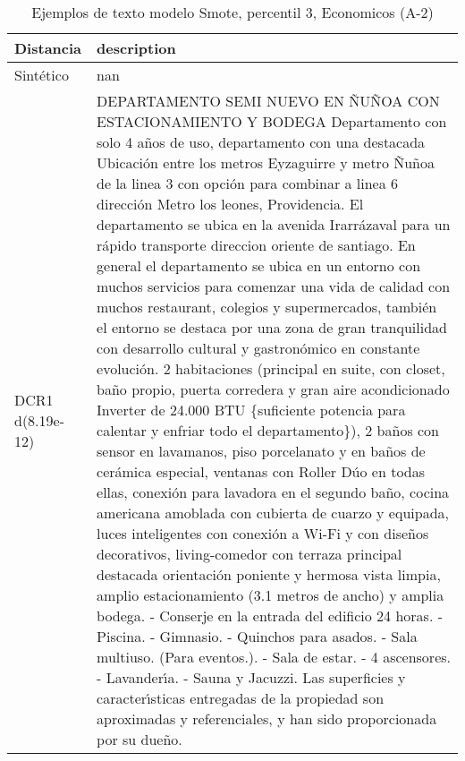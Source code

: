 \begin{table}[H]
\centering
\fontsize{10}{14}\selectfont
\caption{Ejemplos de texto modelo Smote, percentil 3, Economicos (A-2)}
\label{table-example-economicos-a-2-smote-enc-3p-text}
\begin{tabular}{|l|m{35em}|}
\hline
\rowcolor[gray]{0.8}
Distancia & description \\
\hline Sintético & nan \\
\hline DCR1 d(8.19e-12) & DEPARTAMENTO SEMI NUEVO EN \~NU\~NOA CON ESTACIONAMIENTO Y BODEGA  Departamento con solo 4 a\~nos de uso, departamento con una destacada Ubicaci\'on entre los metros Eyzaguirre y metro \~Nu\~noa de la linea 3 con opci\'on para combinar a linea 6 direcci\'on Metro los leones, Providencia. El departamento se ubica en la avenida Irarr\'azaval para un r\'apido transporte direccion oriente de santiago.  En general el departamento se ubica en un entorno con muchos servicios para comenzar una vida de calidad con muchos restaurant, colegios y supermercados, tambi\'en el entorno se destaca por una zona de gran tranquilidad con desarrollo cultural y gastron\'omico en constante evoluci\'on.   2 habitaciones (principal en suite, con closet, ba\~no propio, puerta corredera y gran aire acondicionado Inverter de 24.000 BTU \{suficiente potencia para calentar y enfriar todo el departamento\}), 2 ba\~nos con sensor en lavamanos, piso porcelanato y en ba\~nos de cer\'amica especial, ventanas con Roller D\'uo en todas ellas, conexi\'on para lavadora en el segundo ba\~no, cocina americana amoblada con cubierta de cuarzo y equipada, luces inteligentes con conexi\'on a Wi-Fi y con dise\~nos decorativos, living-comedor con terraza principal destacada orientaci\'on poniente y hermosa vista limpia, amplio estacionamiento (3.1 metros de ancho) y amplia bodega.   - Conserje en la entrada del edificio 24 horas. - Piscina. - Gimnasio. - Quinchos para asados. - Sala multiuso. (Para eventos.). - Sala de estar. - 4 ascensores. - Lavander{\'\i}a. - Sauna y Jacuzzi.   Las superficies y caracter{\'\i}sticas entregadas de la propiedad son aproximadas y referenciales, y han sido proporcionada por su due\~no. \\

\end{tabular}
\end{table}
